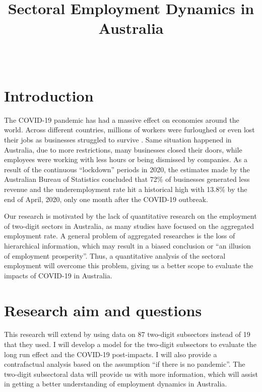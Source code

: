 \documentclass[11pt,a4paper,]{article}
\title{Sectoral Employment Dynamics in Australia}
\author{\sf{\Large\textbf{(Elvis) Zhixiang Yang (ID:30306396)}\\\large \textbf{Email :zyan0056@student.monash.edu}\\[0.5cm]}{\Large\textbf{Farshid Vahid}\\\large \textbf{Email :farshid.vahid@monash.edu}\\[0.5cm]}}
\date{\sf\Date~\Month~\Year}
\makeatletter
\def\titlepage{\front{\expandafter{\@title}}{\@author}{\@organization}}
\makeatother
\begin{document}
\titlepage

\graphicspath{ {/Users/elvisyang/Desktop/Sectoral Employment Forecsating /Research_Proporsal/Elvis_proporsal/figure} }

\hypertarget{introduction}{%
\section{Introduction}\label{introduction}}

The COVID-19 pandemic has had a massive effect on economies around the world. Across different countries, millions of workers were furloughed or even lost their jobs as businesses struggled to survive \autocite{ny2020}. Same situation happened in Australia, due to more restrictions, many businesses closed their doors, while employees were working with less hours or being dismissed by companies. As a result of the continuous ``lockdown'' periods in 2020, the estimates made by the Australian Bureau of Statistics \autocite{ABS2021} concluded that 72\% of businesses generated less revenue and the underemployment rate hit a historical high with 13.8\% by the end of April, 2020, only one month after the COVID-19 outbreak.

Our research is motivated by the lack of quantitative research on the employment of two-digit sectors in Australia, as many studies have focused on the aggregated employment rate. A general problem of aggregated researches is the loss of hierarchical information, which may result in a biased conclusion or ``an illusion of employment prosperity''. Thus, a quantitative analysis of the sectoral employment will overcome this problem, giving us a better scope to evaluate the impacts of COVID-19 in Australia.

\hypertarget{research-aim-and-questions}{%
\section{Research aim and questions}\label{research-aim-and-questions}}

This research will extend \textcite{anderson2020} by using data on 87 two-digit subsectors instead of 19 that they used. I will develop a model for the two-digit subsectors to evaluate the long run effect and the COVID-19 post-impacts. I will also provide a contrafactual analysis based on the assumption ``if there is no pandemic''. The two-digit subsectoral data will provide us with more information, which will assist in getting a better understanding of employment dynamics in Australia.
\end{document}
